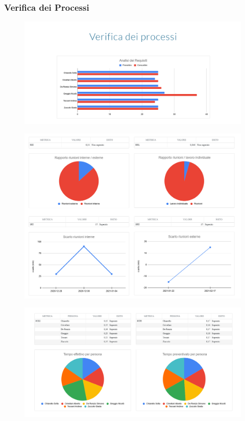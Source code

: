 \subsubsection{Verifica dei Processi}
\begin{figure}[H]
	\includegraphics[scale=0.5]{res/images/cruscotto/adr_1.png}
\end{figure}
\begin{figure}[H]
	\includegraphics[scale=0.4]{res/images/cruscotto/adr_2.png}
\end{figure}
\begin{figure}[H]
	\includegraphics[scale=0.5]{res/images/cruscotto/adr_3.png}
\end{figure}
